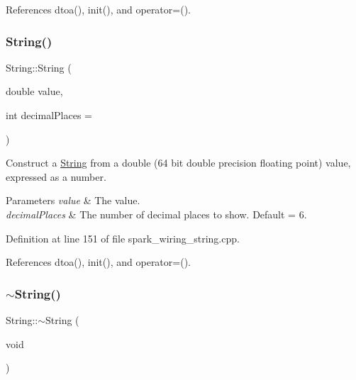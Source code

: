 References dtoa(), init(), and operator=().

\mbox{\label{class_string_a46e13b4608fbe763b4fc5bf22362078e}} 
\subsubsection{\texorpdfstring{String()}{String()}\hspace{0.1cm}{\footnotesize\ttfamily [13/13]}}
{\footnotesize\ttfamily String\+::\+String (\begin{DoxyParamCaption}\item[{double}]{value,  }\item[{int}]{decimal\+Places = {} }\end{DoxyParamCaption})\hspace{0.3cm}{\ttfamily [explicit]}}



Construct a \hyperlink{class_string}{String} from a double (64 bit double precision floating point) value, expressed as a number. 


\begin{DoxyParams}{Parameters}
{\em value} & The value.\\
\hline
{\em decimal\+Places} & The number of decimal places to show. Default = 6. \\
\hline
\end{DoxyParams}


Definition at line 151 of file spark\+\_\+wiring\+\_\+string.\+cpp.



References dtoa(), init(), and operator=().

\mbox{\label{class_string_ab4027f1abc8f8c0134f6098126de71e5}} 
\subsubsection{\texorpdfstring{$\sim$\+String()}{~String()}}
{\footnotesize\ttfamily String\+::$\sim$\+String (\begin{DoxyParamCaption}\item[{void}]{ }\end{DoxyParamCaption})}




